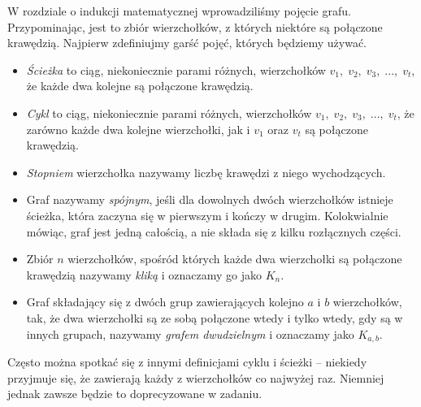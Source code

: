 


\noindent
W rozdziale o indukcji matematycznej wprowadziliśmy pojęcie grafu. Przypominając, jest to zbiór wierzchołków, z których niektóre są połączone krawędzią. Najpierw zdefiniujmy garść pojęć, których będziemy używać.

\vspace{5px}


\noindent
\begin{itemize}
    \item \textit{Ścieżka} to ciąg, niekoniecznie parami różnych, wierzchołków $v_1, \; v_2, \; v_3, \; ..., \; v_t$, że każde dwa kolejne są połączone krawędzią.
    \item \textit{Cykl} to ciąg, niekoniecznie parami różnych, wierzchołków $v_1, \; v_2, \; v_3, \; ..., \; v_t$, że zarówno każde dwa kolejne wierzchołki, jak i $v_1$ oraz $v_t$ są połączone krawędzią. 
    \item \textit{Stopniem} wierzchołka nazywamy liczbę krawędzi z niego wychodzących.
    \item Graf nazywamy \textit{spójnym}, jeśli dla dowolnych dwóch wierzchołków istnieje ścieżka, która zaczyna się w pierwszym i kończy w drugim. Kolokwialnie mówiąc, graf jest jedną całością, a nie składa się z kilku rozłącznych części.
    \item Zbiór $n$ wierzchołków, spośród których każde dwa wierzchołki są połączone krawędzią nazywamy \textit{kliką} i oznaczamy go jako $K_n$.
    \item Graf składający się z dwóch grup zawierających kolejno $a$ i $b$ wierzchołków, tak, że dwa wierzchołki są ze sobą połączone wtedy i tylko wtedy, gdy są w innych grupach, nazywamy \textit{grafem dwudzielnym} i oznaczamy jako $K_{a, b}$.
\end{itemize}

\begin{remark}
    Często można spotkać się z innymi definicjami cyklu i ścieżki -- niekiedy przyjmuje się, że zawierają każdy z wierzchołków co najwyżej raz. Niemniej jednak zawsze będzie to doprecyzowane w zadaniu.
\end{remark}

